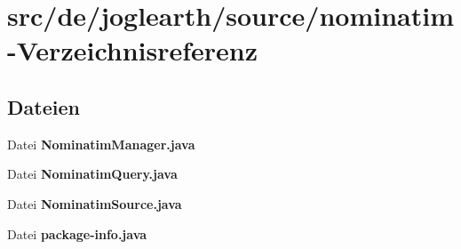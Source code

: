 \section{src/de/joglearth/source/nominatim-\/\-Verzeichnisreferenz}
\label{dir_dbb95c5d75ef51ed263384eca05d0ffb}
\subsection*{Dateien}
\begin{DoxyCompactItemize}
\item 
Datei {\bfseries Nominatim\-Manager.\-java}
\item 
Datei {\bfseries Nominatim\-Query.\-java}
\item 
Datei {\bfseries Nominatim\-Source.\-java}
\item 
Datei {\bfseries package-\/info.\-java}
\end{DoxyCompactItemize}
